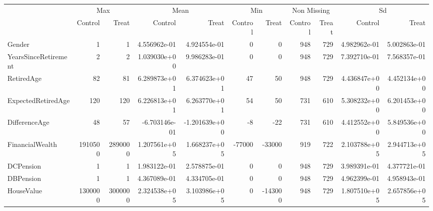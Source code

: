 
\begin{tabular}[t]{lrrrrrrrrrr}
\toprule
\multicolumn{1}{c}{ } & \multicolumn{2}{c}{Max} & \multicolumn{2}{c}{Mean} & \multicolumn{2}{c}{Min} & \multicolumn{2}{c}{Non Missing} & \multicolumn{2}{c}{Sd} \\
\cmidrule(l{3pt}r{3pt}){2-3} \cmidrule(l{3pt}r{3pt}){4-5} \cmidrule(l{3pt}r{3pt}){6-7} \cmidrule(l{3pt}r{3pt}){8-9} \cmidrule(l{3pt}r{3pt}){10-11}
 & Control & Treat & Control & Treat & Control & Treat & Control & Treat & Control & Treat\\
\midrule
Gender & 1 & 1 & 4.556962e-01 & 4.924554e-01 & 0 & 0 & 948 & 729 & 4.982962e-01 & 5.002863e-01\\
YearsSinceRetirement & 2 & 2 & 1.039030e+00 & 9.986283e-01 & 0 & 0 & 948 & 729 & 7.392710e-01 & 7.568357e-01\\
RetiredAge & 82 & 81 & 6.289873e+01 & 6.374623e+01 & 47 & 50 & 948 & 729 & 4.436847e+00 & 4.452134e+00\\
ExpectedRetiredAge & 120 & 120 & 6.226813e+01 & 6.263770e+01 & 54 & 50 & 731 & 610 & 5.308232e+00 & 6.201453e+00\\
DifferenceAge & 48 & 57 & -6.703146e-01 & -1.201639e+00 & -8 & -22 & 731 & 610 & 4.412552e+00 & 5.849536e+00\\
\addlinespace
FinancialWealth & 1910500 & 2890000 & 1.207561e+05 & 1.668237e+05 & -77000 & -33000 & 919 & 722 & 2.103788e+05 & 2.944713e+05\\
DCPension & 1 & 1 & 1.983122e-01 & 2.578875e-01 & 0 & 0 & 948 & 729 & 3.989391e-01 & 4.377721e-01\\
DBPension & 1 & 1 & 4.367089e-01 & 4.334705e-01 & 0 & 0 & 948 & 729 & 4.962399e-01 & 4.958943e-01\\
HouseValue & 1300000 & 3000000 & 2.324538e+05 & 3.103986e+05 & 0 & -143000 & 948 & 729 & 1.807510e+05 & 2.657856e+05\\
\bottomrule
\end{tabular}
